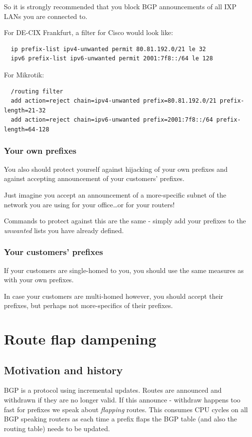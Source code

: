 So it is strongly recommended that you  block BGP announcements of all IXP LANs you are connected to.

For DE-CIX Frankfurt, a filter for Cisco would look like:
\begin{verbatim}
  ip prefix-list ipv4-unwanted permit 80.81.192.0/21 le 32
  ipv6 prefix-list ipv6-unwanted permit 2001:7f8::/64 le 128
\end{verbatim}

For Mikrotik:
\begin{verbatim}
  /routing filter
  add action=reject chain=ipv4-unwanted prefix=80.81.192.0/21 prefix-length=21-32
  add action=reject chain=ipv6-unwanted prefix=2001:7f8::/64 prefix-length=64-128
\end{verbatim}

\subsubsection{Your own prefixes}
You also should protect yourself against hijacking of your own prefixes and against accepting announcement of your customers' prefixes.

Just imagine you accept an announcement of a more-specific subnet of the network you are using for your office\ldots or for your routers!

Commands to protect against this are the same - simply add your prefixes to the \emph{unwanted} lists you have already defined.

\subsubsection{Your customers' prefixes}
If your customers are single-homed to you, you should use the same measures as with your own prefixes.

In case your customers are multi-homed however, you should accept their prefixes, but perhaps not more-specifics of their prefixes.

\section{Route flap dampening}
\subsection{Motivation and history}
BGP is a protocol using incremental updates. Routes are announced and withdrawn if they are no longer valid. If this announce - withdraw happens too fast for prefixes we speak about \emph{flapping} routes. This consumes CPU cycles on all BGP speaking routers as each time a prefix flaps the BGP table (and also the routing table) needs to be updated.

